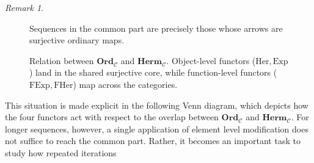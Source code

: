 \documentclass[11pt]{book}
\theoremstyle{definition}
\theoremstyle{plain}
\theoremstyle{remark}
\newtheorem*{remark}{Remark}
\begin{document}
\begin{remark}
\begin{figure}[h]
\begin{tikzpicture}[>=Stealth, scale=1.4, every node/.style={font=\small}]
\end{tikzpicture}

\vspace{0.5em}
\footnotesize
Sequences in the common part are precisely those whose arrows are surjective ordinary maps.
\caption{Relation between $\mathbf{Ord}_{\mathcal C}$ and $\mathbf{Herm}_{\mathcal C}$. 
Object-level functors ($\mathrm{Her},\mathrm{Exp}$) land in the shared surjective core, 
while function-level functors ($\mathrm{FExp},\mathrm{FHer}$) map across the categories.}
\end{figure}
\medskip
This situation is made explicit in the following Venn diagram, which depicts how the four functors act with respect to the overlap 
between $\mathbf{Ord}_\mathcal C$ and $\mathbf{Herm}_\mathcal C$. 
For longer sequences, however, a single application of element level modification does not suffice to reach the common part. 
Rather, it becomes an important task to study how repeated iterations
\end{remark}
\end{document}

